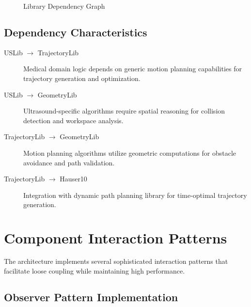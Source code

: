 \begin{figure}[H]
\caption{Library Dependency Graph}
\label{fig:dependency_graph}
\end{figure}

\subsection{Dependency Characteristics}

\begin{description}
    \item[USLib $\rightarrow$ TrajectoryLib] Medical domain logic depends on generic motion planning capabilities for trajectory generation and optimization.
    
    \item[USLib $\rightarrow$ GeometryLib] Ultrasound-specific algorithms require spatial reasoning for collision detection and workspace analysis.
    
    \item[TrajectoryLib $\rightarrow$ GeometryLib] Motion planning algorithms utilize geometric computations for obstacle avoidance and path validation.
    
    \item[TrajectoryLib $\rightarrow$ Hauser10] Integration with dynamic path planning library for time-optimal trajectory generation.
\end{description}

\section{Component Interaction Patterns}
\label{sec:interaction_patterns}

The \rus{} architecture implements several sophisticated interaction patterns that facilitate loose coupling while maintaining high performance.

\subsection{Observer Pattern Implementation}

